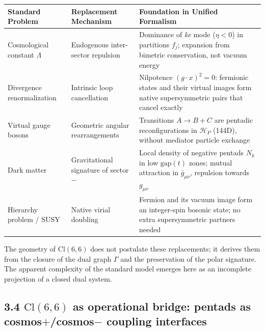 \documentclass[11pt]{article}
\let\oldmathcal\mathcal
\renewcommand{\mathcal}[1]{\oldmathcal{#1}}
\begin{document}
\begin{table}[H]
\centering
\small
\begin{tabularx}{\textwidth}{@{}lXX@{}}
\toprule
Standard Problem & Replacement Mechanism & Foundation in Unified Formalism \\
\midrule
Cosmological constant $\Lambda$ & Endogenous inter-sector repulsion & Dominance of \textit{ke} mode ($\eta <0$) in partitions $f_j$; expansion from bimetric conservation, not vacuum energy \\
Divergence renormalization & Intrinsic loop cancellation & Nilpotence $(g\cdot x)^2=0$: fermionic states and their virtual images form native supersymmetric pairs that cancel exactly \\
Virtual gauge bosons & Geometric angular rearrangements & Transitions $A \to B+C$ are pentadic reconfigurations in $\mathcal{H}_P$ (144D), without mediator particle exchange \\
Dark matter & Gravitational signature of sector $-$ & Local density of negative pentads $N_k$ in low $\text{gap}(t)$ zones; mutual attraction in $\bar{g}_{\mu\nu}$, repulsion towards $g_{\mu\nu}$ \\
Hierarchy problem / SUSY & Native virial doubling & Fermion and its vacuum image form an integer-spin bosonic state; no extra supersymmetric partners needed \\
\bottomrule
\end{tabularx}
\end{table}

The geometry of \(\text{Cl}(6,6)\) does not postulate these
replacements; it derives them from the closure of the dual graph
\(\Gamma\) and the preservation of the polar signature. The apparent
complexity of the standard model emerges here as an incomplete
projection of a closed dual system.

\hypertarget{textcl66-as-operational-bridge-pentads-as-cosmoscosmos--coupling-interfaces}{%
\subsection{\texorpdfstring{3.4 \(\text{Cl}(6,6)\) as operational
bridge: pentads as cosmos\(+\)/cosmos\(-\) coupling
interfaces}{3.4 \textbackslash text\{Cl\}(6,6) as operational bridge: pentads as cosmos+/cosmos- coupling interfaces}}\label{textcl66-as-operational-bridge-pentads-as-cosmoscosmos--coupling-interfaces}}
\end{document}
